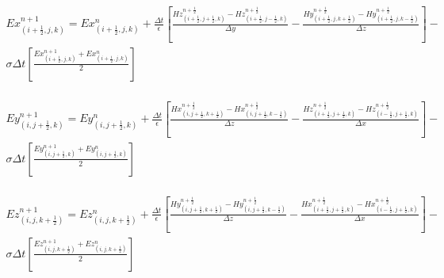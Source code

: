 \begin{equation}
\begin{array}{rcr}
	Ex_{(i+\frac{1}{2},j, k)}^{n+1} =
    Ex_{(i+\frac{1}{2},j, k)}^{n} +
    \frac{\Delta{t}}{\epsilon} \left [ \frac{Hz^{n+\frac{1}{2}}_{(i+\frac{1}{2},j+\frac{1}{2}, k)} - Hz^{n+\frac{1}{2}}_{(i+\frac{1}{2},j-\frac{1}{2}, k)}}{\Delta{y}}-
    \frac{Hy^{n+\frac{1}{2}}_{(i+\frac{1}{2},j, k+\frac{1}{2})} - Hy^{n+\frac{1}{2}}_{(i+\frac{1}{2},j, k-\frac{1}{2})}}{\Delta{z}} \right ]- \\
\sigma \Delta{t} 
\left [ \frac{Ex_{(i+\frac{1}{2}, j, k)}^{n+1} + Ex_{(i+\frac{1}{2}, j, k)}^{n}}{2} \right ]  
\end{array}
\end{equation}\\
\begin{equation}
\begin{array}{rcr}
	Ey_{(i,j+\frac{1}{2}, k)}^{n+1} =
    Ey_{(i,j+\frac{1}{2}, k)}^{n} +
    \frac{\Delta{t}}{\epsilon} \left [
	 \frac{Hx^{n+\frac{1}{2}}_{(i,j+\frac{1}{2}, k+\frac{1}{2})} - Hx^{n+\frac{1}{2}}_{(i,j+\frac{1}{2}, k-\frac{1}{2})}}{\Delta{z}}-
	 \frac{Hz^{n+\frac{1}{2}}_{(i+\frac{1}{2},j+\frac{1}{2}, k)} - Hz^{n+\frac{1}{2}}_{(i-\frac{1}{2},j+\frac{1}{2}, k)}}{\Delta{x}} 
\right ]-\\
\sigma \Delta{t} \left [ 
\frac{Ey_{(i, j+\frac{1}{2}, k)}^{n+1} + Ey_{(i, j+\frac{1}{2}, k)}^{n}}{2} 
\right ]
\end{array}  
\end{equation}\\
\begin{equation}
\begin{array}{rrr}
	Ez_{(i,j, k+\frac{1}{2})}^{n+1} =
    Ez_{(i,j, k+\frac{1}{2})}^{n} +
    \frac{\Delta{t}}{\epsilon} \left [ \frac{Hy^{n+\frac{1}{2}}_{(i,j+\frac{1}{2}, k+\frac{1}{2})} - Hy^{n+\frac{1}{2}}_{(i,j+\frac{1}{2}, k-\frac{1}{2})}}{\Delta{z}}-
    \frac{Hx^{n+\frac{1}{2}}_{(i+\frac{1}{2},j+\frac{1}{2}, k)} - Hx^{n+\frac{1}{2}}_{(i-\frac{1}{2},j+\frac{1}{2}, k)}}{\Delta{x}} \right ]-\\
\sigma \Delta{t} \left [ 
\frac{Ez_{(i, j, k+\frac{1}{2})}^{n+1} + Ez_{(i, j, k+\frac{1}{2})}^{n}}{2} 
\right ]
\end{array}
\end{equation}


